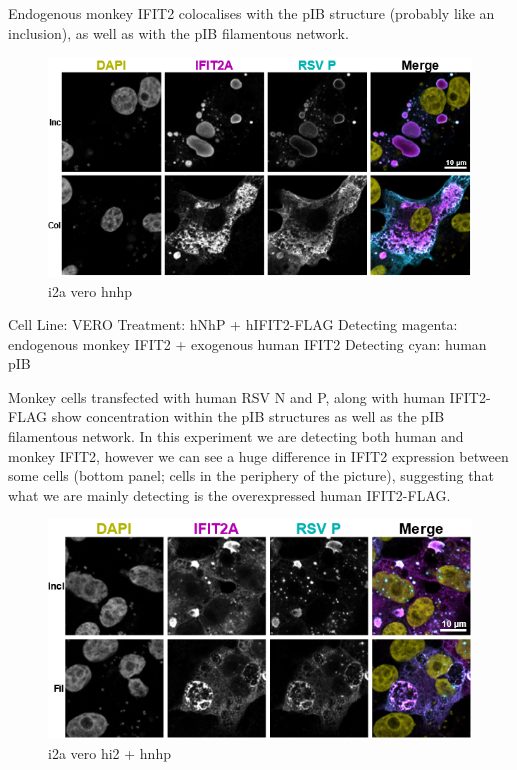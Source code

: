 Endogenous monkey IFIT2 colocalises with the pIB structure (probably like an inclusion), as well as with the pIB filamentous network.

\begin{figure}
    \centering
    \includegraphics[width=1\linewidth]{10. Chapter 5//Figs//01. I2A/02. i2a vero hnhp.png}
    \caption[i2a vero hnhp]{i2a vero hnhp}
    \label{fig:i2a vero hnhp}
\end{figure}

Cell Line: VERO \newline
Treatment: hNhP + hIFIT2-FLAG \newline
Detecting magenta: endogenous monkey IFIT2 + exogenous human IFIT2 \newline
Detecting cyan: human pIB \newline

Monkey cells transfected with human RSV N and P, along with human IFIT2-FLAG show concentration within the pIB structures as well as the pIB filamentous network. In this experiment we are detecting both human and monkey IFIT2, however we can see a huge difference in IFIT2 expression between some cells (bottom panel; cells in the periphery of the picture), suggesting that what we are mainly detecting is the overexpressed human IFIT2-FLAG.

\begin{figure}
    \centering
    \includegraphics[width=1\linewidth]{10. Chapter 5//Figs//01. I2A/03. i2a vero hi2 hnhp.png}
    \caption[i2a vero hi2 + hnhp]{i2a vero hi2 + hnhp}
    \label{fig:i2a vero hi2 + hnhp}
\end{figure}

